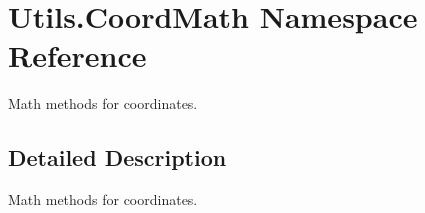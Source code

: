 \hypertarget{namespaceUtils_1_1CoordMath}{}\section{Utils.\+Coord\+Math Namespace Reference}
\label{namespaceUtils_1_1CoordMath}


Math methods for coordinates.  




\subsection{Detailed Description}
Math methods for coordinates. 